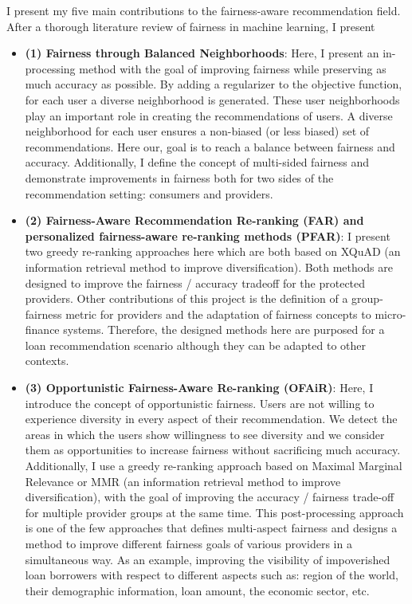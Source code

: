 I present my five main contributions to the fairness-aware recommendation field. After a thorough literature review of fairness in machine learning, I present 
\begin{itemize}
    \item \textbf{(1) Fairness through Balanced Neighborhoods}:
    Here, I present an in-processing method with the goal of improving fairness while preserving as much accuracy as possible.
    By adding a regularizer to the objective function, for each user a diverse neighborhood is generated. These user neighborhoods play an important role in creating the recommendations of users. A diverse neighborhood for each user ensures a non-biased (or less biased) set of recommendations. Here our, goal is to reach a balance between fairness and accuracy. Additionally, I define the concept of multi-sided fairness and demonstrate improvements in fairness both for two sides of the recommendation setting: consumers and providers. 
    
    \item \textbf{(2) Fairness-Aware Recommendation Re-ranking (FAR) and personalized fairness-aware re-ranking methods (PFAR)}: 
    I present two greedy re-ranking approaches here which are both based on XQuAD (an information retrieval method to improve diversification). Both methods are designed to improve the fairness / accuracy tradeoff for the protected providers. 
    Other contributions of this project is the definition of a group-fairness metric for providers and the adaptation of fairness concepts to micro-finance systems. Therefore, the designed methods here are purposed for a loan recommendation scenario although they can be adapted to other contexts.
    
    \item \textbf{(3) Opportunistic Fairness-Aware Re-ranking (OFAiR)}:
    Here, I introduce the concept of opportunistic fairness. Users are not willing to experience diversity in every aspect of their recommendation. We detect the areas in which the users show willingness to see diversity and we consider them as opportunities to increase fairness without sacrificing much accuracy.
    Additionally, I use a greedy re-ranking approach based on Maximal Marginal Relevance or MMR (an information retrieval method to improve diversification), with the goal of improving the accuracy / fairness trade-off for multiple provider groups at the same time. This post-processing approach is one of the few approaches that defines multi-aspect fairness and designs a method to improve different fairness goals of various providers in a simultaneous way. As an example, improving the visibility of impoverished loan borrowers with respect to different aspects such as: region of the world, their demographic information, loan amount, the economic sector, etc.
    

\end{itemize}

